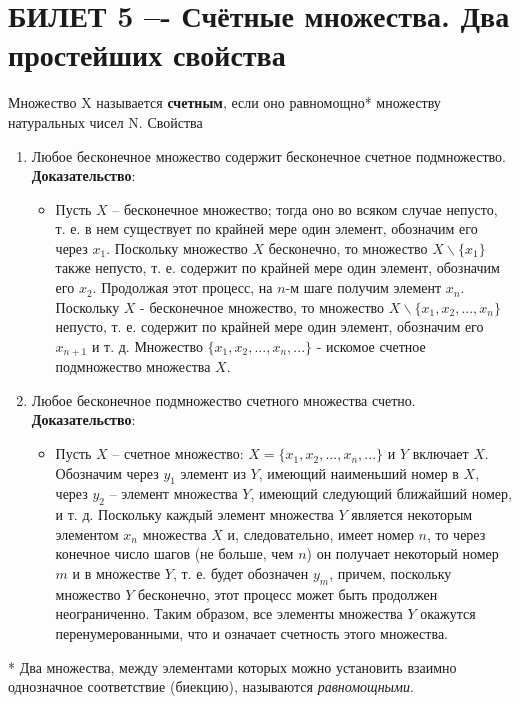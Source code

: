 \documentclass{article}
\begin{document}
\section{БИЛЕТ 5 –- Счётные множества. Два простейших свойства}
Множество X называется \textbf{счетным}, если оно равномощно* множеству натуральных чисел N.
Свойства
\begin{enumerate}
    \item Любое бесконечное множество содержит бесконечное счетное подмножество.
    \newline
    \newline
    \textbf{Доказательство}:
    \begin{itemize}
    \item Пусть $X$ -- бесконечное множество; тогда оно во всяком случае непусто, т. е. в нем существует по крайней мере один элемент, обозначим его через $x_{1}$. Поскольку множество $X$ бесконечно, то множество $X \backslash \{x_{1}\}$ также непусто, т. е. содержит по крайней мере один элемент, обозначим его $x_{2}$. Продолжая этот процесс, на $n$-м шаге получим элемент $x_{n}$. Поскольку $X$ - бесконечное множество, то множество $X \backslash \{x_{1}, x_{2}, ..., x_{n}\}$ непусто, т. е. содержит по крайней мере один элемент, обозначим его $x_{n+1}$ и т. д. Множество $\{x_{1}, x_{2}, ..., x_{n}, ...\}$ - искомое счетное подмножество множества $X$.
    \end{itemize}
    \item Любое бесконечное подмножество счетного множества счетно.
    \newline
    \newline
    \textbf{Доказательство}:
    \begin{itemize}
        \item Пусть $X$ -- счетное множество: $X = \{x_{1}, x_{2}, ..., x_{n}, ...\}$  и $Y$ включает $X$. Обозначим через $y_{1}$ элемент из $Y$, имеющий наименьший номер в $X$, через  $y_{2}$ -- элемент множества $Y$, имеющий следующий ближайший номер, и т. д. Поскольку каждый элемент множества $Y$ является некоторым элементом $x_{n}$ множества $X$ и, следовательно, имеет номер $n$, то через конечное число шагов (не больше, чем $n$) он получает некоторый номер $m$ и в множестве $Y$, т. е. будет обозначен $y_{m}$, причем, поскольку множество $Y$ бесконечно, этот процесс может быть продолжен неограниченно. Таким образом, все элементы множества $Y$ окажутся перенумерованными, что и означает счетность этого множества.
    \end{itemize}
    \end{enumerate}
* Два множества, между элементами которых можно установить взаимно однозначное соответствие (биекцию), называются \textit{равномощными}.
\newpage
\end{document}
